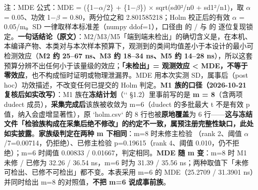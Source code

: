 \documentclass[UTF8,fontset=fandol,11pt,a4paper]{ctexart}
\begin{document}
\begin{landscape}
\noindent 注：MDE 公式：MDE = (\texttt{}\{1\texorpdfstring{$-$}{-}\texorpdfstring{$\alpha$}{alpha}/2\} + \texttt{}\{1\texorpdfstring{$-$}{-}\texorpdfstring{$\beta$}{beta}\}) \texorpdfstring{$\times$}{x} sqrt(sd0²/n0 + sd1²/n1)，取 \texorpdfstring{$\alpha$}{alpha} = 0.05、功效 1\texorpdfstring{$-$}{-}\texorpdfstring{$\beta$}{beta} = 0.80，两分位之和 2.801585218；Holm 校正后的有效 \texorpdfstring{$\alpha$}{alpha} = 0.05/m。SD 一律取样本标准差（numpy ddof=1），口径由 \texttt{} 的 \texttt{} / \texttt{} 与 \texttt{} 的 \texttt{} 逐位复现锁定。\textbf{一句话结论（原文）}：M2/M3/M5「端到端未检出」的确切含义是，在本机、本编译产物、本类对与本次样本预算下，观测到的类间均值差小于本设计的最小可检测效应（\textbf{M2 约 25–67 ns、M3 约 18–34 ns、M5 约 14–28 ns}），所以这套预算分辨不出任何小于该量级的效应；\textbf{「未检出」= 观测效应 < MDE，不等于零效应}，也不构成恒时证明或物理泄漏界。MDE 用本次实测 SD，属事后（post hoc）功效描述，不改变任何已提交的 Holm 判定。\textbf{M1 族的口径（2026-10-21 复核后如实改写）}：M1 族在\textbf{冻结计划}（`\texttt{}` §1.2）里事前写的是 \textbf{m = 8}（含两项 dudect 成员），\textbf{采集完成后}该族被收敛为 m=6（dudect 的多批最大 t 不是有效 p 值，纳入会虚增显著性），原 `holm.csv` 的 8 行也被\textbf{原地覆盖}为 6 行——\textbf{这与冻结文件「检验族构成在采集后绝不修改」的约定不一致，属预注册完整性缺口，此处如实披露}。\textbf{家族级判定在两种 m 下相同}：m=8 时未修主检验 \texttt{}（rank 2、阈值 \texorpdfstring{$\alpha$}{alpha}/7=0.00714，仍拒绝）、已修主检验 p=0.19615（rank 4、阈值 0.010，仍不拒绝）；m=6 时阈值 0.00833 / 0.01667，判定相同。\textbf{MDE 随 m 变}：m=8 时 M1 未修 / 已修为 32.26 / 36.54 ns，m=6 时为 31.39 / 35.56 ns；两种取值下「未修可检出、已修不可检出」都不变。本表采用 m=6 的 MDE（25.2709 / 31.3901 ns）并同时给出 m=8 的对照值，\textbf{不把 m=6 说成事前族}。\par\endgroup\vspace{3mm}\end{landscape}
\begingroup\small\setlength{\tabcolsep}{4pt}\renewcommand{\arraystretch}{1.25}
\end{document}
